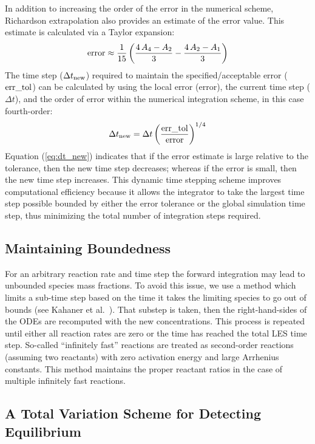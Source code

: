 In addition to increasing the order of the error in the numerical scheme, Richardson extrapolation also provides an estimate of the error value. This estimate is calculated via a Taylor expansion:
\begin{equation}\label{eq:error}
\hbox{error} \approx \frac{1}{15}\left(\frac{4\,A_4-A_2}{3} - \frac{4\,A_2-A_1}{3}\right)
\end{equation}
The time step ($\Delta t_{\rm new}$) required to maintain the specified/acceptable error ($\rm err\_tol$) can be calculated by using the local error (error), the current time step ($\Delta t$), and the order of error within the numerical integration scheme, in this case fourth-order:
\begin{equation}\label{eq:dt_new}
\Delta t_{\rm new}=\Delta t \left(\frac{\rm err\_tol}{\rm error}\right)^{1/4}
\end{equation}
Equation (\ref{eq:dt_new}) indicates that if the error estimate is large relative to the tolerance, then the new time step decreases; whereas if the error is small, then the new time step increases. This dynamic time stepping scheme improves computational efficiency because it allows the integrator to take the largest time step possible bounded by either the error tolerance or the global simulation time step, thus minimizing the total number of integration steps required.

\subsection*{Maintaining Boundedness}

For an arbitrary reaction rate and time step the forward integration may lead to unbounded species mass fractions.  To avoid this issue, we use a method which limits a sub-time step based on the time it takes the limiting species to go out of bounds (see Kahaner et al.~\cite{Kahaner:1989}).  That substep is taken, then the right-hand-sides of the ODEs are recomputed with the new concentrations.  This process is repeated until either all reaction rates are zero or the time has reached the total LES time step.  So-called ``infinitely fast'' reactions are treated as second-order reactions (assuming two reactants) with zero activation energy and large Arrhenius constants.  This method maintains the proper reactant ratios in the case of multiple infinitely fast reactions.

\subsection*{A Total Variation Scheme for Detecting Equilibrium}

